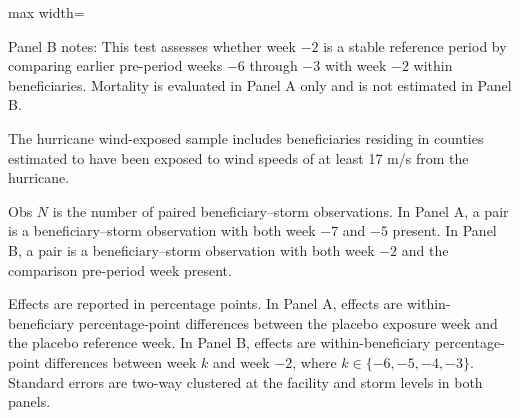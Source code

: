 \documentclass[11pt]{article}
\begin{document}
\begin{table}[!htbp]
\begin{adjustbox}{max width=\textwidth}
\begin{threeparttable}
\begin{tablenotes}[flushleft]
\addlinespace[0.8em]
\item[] Panel B notes: This test assesses whether week $-2$ is a stable reference period by comparing earlier pre-period weeks $-6$ through $-3$ with week $-2$ within beneficiaries. Mortality is evaluated in Panel A only and is not estimated in Panel B.

\addlinespace[0.8em]
\item[a] The hurricane wind-exposed sample includes beneficiaries residing in counties estimated to have been exposed to wind speeds of at least 17 m/s from the hurricane.

\item[b] Obs $N$ is the number of paired beneficiary--storm observations. In Panel A, a pair is a beneficiary--storm observation with both week $-7$ and $-5$ present. In Panel B, a pair is a beneficiary--storm observation with both week $-2$ and the comparison pre-period week present.

\item[c] Effects are reported in percentage points. In Panel A, effects are within-beneficiary percentage-point differences between the placebo exposure week and the placebo reference week. In Panel B, effects are within-beneficiary percentage-point differences between week $k$ and week $-2$, where $k \in \{-6,-5,-4,-3\}$. Standard errors are two-way clustered at the facility and storm levels in both panels.

\end{tablenotes}

\end{threeparttable}
\end{adjustbox}

\end{table}
\end{document}
